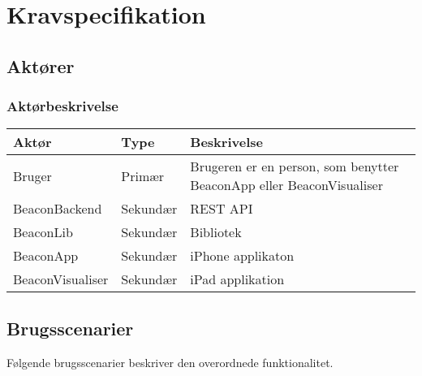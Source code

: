 \chapter{Kravspecifikation}
\label{ch:kravspecifikation}

\section{Aktører}
\subsection{Aktørbeskrivelse}

\begin{table}[h]
\begin{tabular}{@{}lll@{}}
\toprule
\textbf{Aktør} & \textbf{Type} & \textbf{Beskrivelse}                                          \\ \midrule
Bruger         & Primær        & Brugeren er en person, som benytter BeaconApp eller BeaconVisualiser \\ \midrule
BeaconBackend  & Sekundær               & REST API	\\ \midrule
BeaconLib      &  Sekundær              & Bibliotek                                                    \\ \midrule
BeaconApp    & Sekundær               & iPhone applikaton                                             \\ \midrule
BeaconVisualiser      & Sekundær               & iPad applikation                                              \\ \bottomrule
\end{tabular}
\end{table}

\section{Brugsscenarier}

Følgende brugsscenarier beskriver den overordnede funktionalitet.

